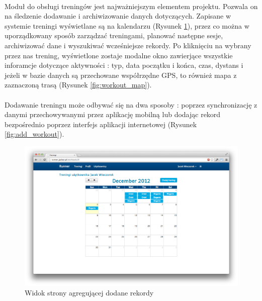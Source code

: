\paragraph{}
Moduł do obsługi treningów jest najważniejszym elementem projektu. Pozwala on na śledzenie dodawanie i archiwizowanie danych dotyczących. Zapisane w systemie treningi wyświetlane są na kalendarzu (Rysunek \ref{fig:workout_main}), przez co można w uporządkowany sposób zarządzać treningami, planować następne sesje, archiwizować dane i wyszukiwać wcześniejsze rekordy. Po kliknięciu na wybrany przez nas trening, wyświetlone zostaje modalne okno zawierjące wszystkie inforamcje dotyczące aktywności : typ, data początku i końca, czas, dystans i jeżeli w bazie danych są przechowane współrzędne GPS, to również mapa z zaznaczoną trasą (Rysunek \ref{fig:workout_map}).
\paragraph{} %
\label{par:}

 Dodawanie treningu może odbywać się na dwa sposoby : poprzez synchronizację z danymi przechowywanymi przez aplikację mobilną lub dodając rekord bezpośrednio poprzez interfejs aplikacji internetowej (Rysunek \ref{fig:add_workout}).


\begin{figure}[ht]
	\centering
		\includegraphics[width=1\linewidth]{assets/workouts_main.png}
	\caption{Widok strony agregującej dodane rekordy}
	\label{fig:workout_main}
\end{figure}

